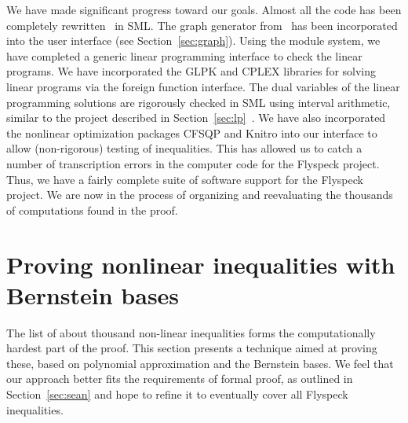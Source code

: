 \documentclass[11pt]{amsart}
\begin{document}
We have made significant progress toward our goals. Almost all the
code has been completely rewritten~\cite{McLaughlin:2008:KeplerCode} in
SML. The graph generator
from~\cite{NipkowBS-IJCAR06} has been incorporated into the user
interface (see Section~\ref{sec:graph}). Using the module system, we have completed a generic linear
programming interface to check the linear programs. We have
incorporated the GLPK and CPLEX libraries for solving linear programs
via the foreign function interface. The dual variables of the linear
programming solutions are rigorously checked in SML using interval
arithmetic, similar to the project described in Section~\ref{sec:lp}~\cite{Obua:2005:Thesis}. We have
also incorporated the nonlinear optimization packages CFSQP and Knitro
into our interface to allow (non-rigorous) testing of inequalities.
This has allowed us to catch a number of transcription errors in
the computer code for the Flyspeck project. 
Thus, we have a fairly complete suite
of software support for the Flyspeck project. We are now in the
process of organizing and reevaluating the thousands of computations
found in the proof.

\section{Proving nonlinear inequalities with Bernstein bases}
\label{sec:zumkeller}

The list of about thousand non-linear inequalities forms the computationally
hardest part of the proof. This section presents a technique aimed at proving
these, based on polynomial approximation and the Bernstein bases. We feel that
our approach better fits the requirements of formal proof, as outlined in
Section~\ref{sec:sean} and hope to refine it to eventually cover all Flyspeck
inequalities.
\end{document}
